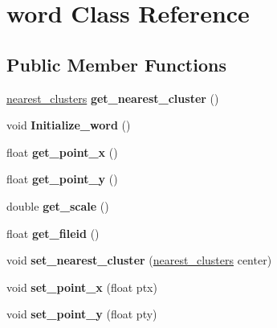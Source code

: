 \hypertarget{classword}{
\section{word Class Reference}
\label{classword}
}
\subsection*{Public Member Functions}
\begin{DoxyCompactItemize}
\item 
\hypertarget{classword_ab250ba2c17e7104e0baf019b44811810}{
\hyperlink{classnearest__clusters}{nearest\_\-clusters} {\bfseries get\_\-nearest\_\-cluster} ()}
\label{classword_ab250ba2c17e7104e0baf019b44811810}

\item 
\hypertarget{classword_a026f5080cb2deae2de4200fe2c05eb74}{
void {\bfseries Initialize\_\-word} ()}
\label{classword_a026f5080cb2deae2de4200fe2c05eb74}

\item 
\hypertarget{classword_aa00764bb0003645fe5299d27fd84f415}{
float {\bfseries get\_\-point\_\-x} ()}
\label{classword_aa00764bb0003645fe5299d27fd84f415}

\item 
\hypertarget{classword_ae8f275558c2772d2e55bc18592346960}{
float {\bfseries get\_\-point\_\-y} ()}
\label{classword_ae8f275558c2772d2e55bc18592346960}

\item 
\hypertarget{classword_ac1ba66c95a1e6f713d7cfec6ec42b8cd}{
double {\bfseries get\_\-scale} ()}
\label{classword_ac1ba66c95a1e6f713d7cfec6ec42b8cd}

\item 
\hypertarget{classword_a3d56d36731d75342214eb6d36689909e}{
float {\bfseries get\_\-fileid} ()}
\label{classword_a3d56d36731d75342214eb6d36689909e}

\item 
\hypertarget{classword_a4e977d0e652a0bff6239bd7e8e26d87e}{
void {\bfseries set\_\-nearest\_\-cluster} (\hyperlink{classnearest__clusters}{nearest\_\-clusters} center)}
\label{classword_a4e977d0e652a0bff6239bd7e8e26d87e}

\item 
\hypertarget{classword_adf575c034c6fc40ece021ce75834683f}{
void {\bfseries set\_\-point\_\-x} (float ptx)}
\label{classword_adf575c034c6fc40ece021ce75834683f}

\item 
\hypertarget{classword_af947540dda0e2b82fdf3e17555a84504}{
void {\bfseries set\_\-point\_\-y} (float pty)}
\label{classword_af947540dda0e2b82fdf3e17555a84504}


\end{DoxyCompactItemize}
